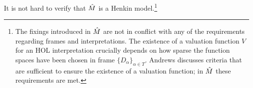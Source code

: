 \begin{definition}
It is not hard to verify that $\hat{M}$ is a Henkin
model.\footnote{The fixings introduced in $\hat{M}$
  are not in conflict with any of the requirements regarding
  frames and interpretations. The existence of a valuation function
  ${V}$ for an HOL interpretation crucially depends on how sparse the
  function spaces have been chosen in frame $\{D_\alpha\}_{\alpha \in
    {T}}$. Andrews \cite{Andrews:gmae72} discusses criteria that are sufficient
  to ensure the existence of a valuation function; in
  $\hat{M}$ these requirements are met.}
 
\end{definition}



